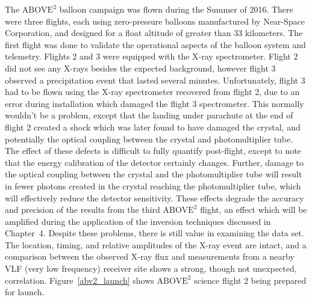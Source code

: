 The $\text{ABOVE}^2$ balloon campaign was flown during the Summer of 2016. There were three flights, each using zero-pressure balloons manufactured by Near-Space Corporation, and designed for a float altitude of greater than 33 kilometers. The first flight was done to validate the operational aspects of the balloon system and telemetry. Flights 2 and 3 were equipped with the X-ray spectrometer. Flight 2 did not see any X-rays besides the expected background, however flight 3 observed a precipitation event that lasted several minutes. Unfortunately, flight 3 had to be flown using the X-ray spectrometer recovered from flight 2, due to an error during installation which damaged the flight 3 spectrometer. This normally wouldn't be a problem, except that the landing under parachute at the end of flight 2 created a shock which was later found to have damaged the crystal, and potentially the optical coupling between the crystal and photomultiplier tube. The effect of these defects is difficult to fully quantify post-flight, except to note that the energy calibration of the detector certainly changes. Further, damage to the optical coupling between the crystal and the photomultiplier tube will result in fewer photons created in the crystal reaching the photomultiplier tube, which will effectively reduce the detector sensitivity. These effects degrade the accuracy and precision of the results from the third $\text{ABOVE}^2$ flight, an effect which will be amplified during the application of the inversion techniques discussed in Chapter~4. Despite these problems, there is still value in examining the data set. The location, timing, and relative amplitudes of the X-ray event are intact, and a comparison between the observed X-ray flux and measurements from a nearby VLF (very low frequency) receiver site shows a strong, though not unexpected, correlation. Figure~\ref{abv2_launch} shows $\text{ABOVE}^2$ science flight 2 being prepared for launch. 

